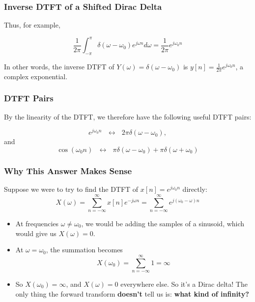 \documentclass{beamer}
\begin{document}
\begin{frame}
  \frametitle{Inverse DTFT of a Shifted Dirac Delta}

  Thus, for example,

  \begin{displaymath}
    \frac{1}{2\pi}\int_{-\pi}^\pi \delta(\omega-\omega_0) e^{j\omega n}d\omega =
    \frac{1}{2\pi}e^{j\omega_0 n}
  \end{displaymath}

  In other words, the inverse DTFT of $Y(\omega)=\delta(\omega-\omega_0)$ is
  $y[n]= \frac{1}{2\pi}e^{j\omega_0 n}$, a complex exponential.
\end{frame}

\begin{frame}
  \frametitle{DTFT Pairs}

  By the linearity of the DTFT, we therefore have the following useful
  DTFT pairs:

  \begin{displaymath}
    e^{j\omega_0 n} ~~~\leftrightarrow ~~~ 2\pi\delta(\omega-\omega_0),
  \end{displaymath}
  and
  \begin{displaymath}
    \cos(\omega_0 n) ~~~\leftrightarrow ~~~ \pi\delta(\omega-\omega_0)+\pi\delta(\omega+\omega_0)
  \end{displaymath}
\end{frame}

\begin{frame}
  \frametitle{Why This Answer Makes Sense}

  Suppose we were to try to find the DTFT of $x[n]=e^{j\omega_0 n}$ directly:
  \begin{displaymath}
    X(\omega) = \sum_{n=-\infty}^\infty x[n]e^{-j\omega n} = \sum_{n=-\infty}^\infty e^{j(\omega_0-\omega)n}
  \end{displaymath}
  \begin{itemize}
  \item At frequencies $\omega\ne\omega_0$, we would be adding the
    samples of a sinusoid, which would give us $X(\omega)=0$.
  \item At $\omega=\omega_0$, the summation becomes
    \begin{displaymath}
      X(\omega_0) = \sum_{n=-\infty}^\infty 1 = \infty
    \end{displaymath}
  \item So $X(\omega_0)=\infty$, and $X(\omega)=0$ everywhere else.
    So it's a Dirac delta!  The only thing the forward transform {\bf
      doesn't} tell us is: {\bf what kind of infinity?}
  \end{itemize}
\end{frame}
\end{document}

